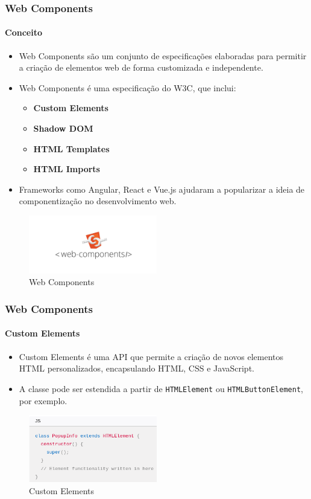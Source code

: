 \documentclass[
	9pt, %
	t, %
]{beamer}
\begin{document}
\begin{frame}
	\frametitle{Web Components}
	\framesubtitle{Conceito}
	\begin{itemize}
		\item Web Components são um conjunto de especificações elaboradas para permitir a criação de elementos web de forma customizada e independente.
		\item Web Components é uma especificação do W3C, que inclui:
		\begin{itemize}
			\item \textbf{Custom Elements}
			\item \textbf{Shadow DOM}
			\item \textbf{HTML Templates}
			\item \textbf{HTML Imports}
		\end{itemize}
		\item Frameworks como Angular, React e Vue.js ajudaram a popularizar a ideia de componentização no desenvolvimento web.
	\end{itemize}

	\begin{figure}
		\centering
		\includegraphics[width=0.5\textwidth]{web_components.jpg}
		\caption{Web Components}
	\end{figure}

\end{frame}

\begin{frame}
	\frametitle{Web Components}
	\framesubtitle{Custom Elements}
	\begin{itemize}
		\item Custom Elements é uma API que permite a criação de novos elementos HTML personalizados, encapsulando HTML, CSS e JavaScript.
		\item A classe pode ser estendida a partir de \texttt{HTMLElement} ou \texttt{HTMLButtonElement}, por exemplo.
	\end{itemize}

	\begin{figure}
		\centering
		\includegraphics[width=0.5\textwidth]{custom_elements.png}
		\caption{Custom Elements}
	\end{figure}

\end{frame}
\end{document}
